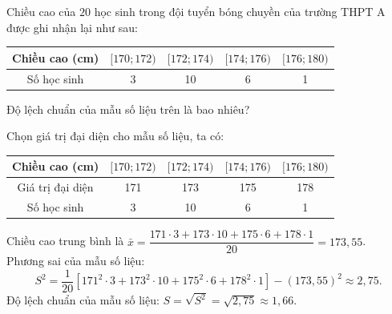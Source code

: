\begin{ex}%
	Chiều cao của $20$ học sinh trong đội tuyển bóng chuyền của trường THPT A được ghi nhận lại như sau:
	\begin{center}
		\begin{tabular}{|c|c|c|c|c|}
			\hline Chiều cao (cm) &{$[170; 172)$} &{$[172; 174)$} &{$[174; 176)$} &{$[176; 180)$} \\
			\hline Số học sinh & 3 & 10 & 6 & 1 \\
			\hline
		\end{tabular}
	\end{center}
	Độ lệch chuẩn của mẫu số liệu trên là bao nhiêu?
	\loigiai
	{
		Chọn giá trị đại diện cho mẫu số liệu, ta có:
		\begin{center}
			\begin{tabular}{|c|c|c|c|c|}
				\hline Chiều cao (cm)  &{$[170; 172)$} &{$[172; 174)$} &{$[174; 176)$} &{$[176; 180)$} \\
				\hline Giá trị đại diện & 171 & 173 & 175 & 178 \\
				\hline Số học sinh & 3 & 10 & 6 & 1 \\
				\hline
			\end{tabular}
		\end{center} 
		Chiều cao trung bình là $\bar{x}=\dfrac{171\cdot 3+173\cdot 10+175\cdot  6+178\cdot 1 }{20}=173{,}55$.\\
		Phương sai của mẫu số liệu:
		$$
		S^2=\dfrac{1}{20}\left[171^2\cdot 3+173^2\cdot 10+175^2\cdot  6+178^2\cdot 1 \right]-\left(173{,}55\right)^2 \approx 2{,}75.
		$$
		Độ lệch chuẩn của mẫu số liệu: $S=\sqrt{S^2}=\sqrt{2{,}75} \approx 1{,}66.$	
	}
\end{ex}

